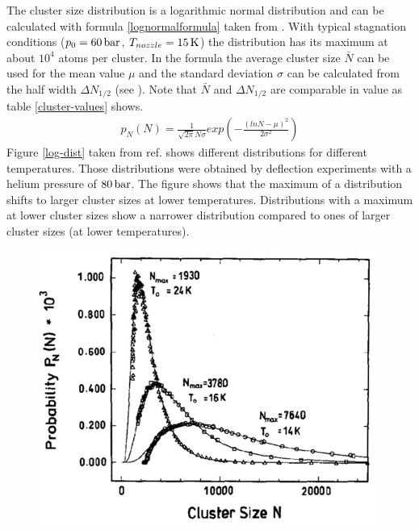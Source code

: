 \documentclass[parskip,12pt,headsepline,a4paper] {scrbook}
\begin{document}
The cluster size distribution is a logarithmic normal distribution and can be calculated with formula \ref{lognormalformula} taken from \cite{speed-distr}. With typical stagnation conditions ($p_0 = \unit[60]{bar}$, $T_{nozzle} = \unit[15]{K}$) the distribution has its maximum at about $10^4$ atoms per cluster. In the formula the average cluster size $\bar{N}$ can be used for the mean value $\mu$ and the standard deviation $\sigma$ can be calculated from the half width $\Delta N_{1/2}$ (see \cite{speed-distr}). Note that $\bar{N}$ and $\Delta N_{1/2}$ are comparable in value as table \ref{cluster-values} shows.
\begin{align}  \label{lognormalformula}
p_N(N) = \frac{1}{\sqrt{2\pi}N \sigma} exp\left(- \frac{(lnN - \mu)^2}{2\sigma^2}\right)
\end{align}
Figure \ref{log-dist} taken from ref. \cite{loga-distributions} shows different distributions for different temperatures. Those distributions were obtained by deflection experiments with a helium pressure of $\unit[80]{bar}$. The figure shows that the maximum of a distribution shifts to larger cluster sizes at lower temperatures. Distributions with a maximum at lower cluster sizes show a narrower distribution compared to ones of larger cluster sizes (at lower temperatures).

\begin{figure}[ht]
\centerline{
\includegraphics[width=11cm]{./expansion/log-normal-distribution.jpg}}
\end{figure}
\end{document}
